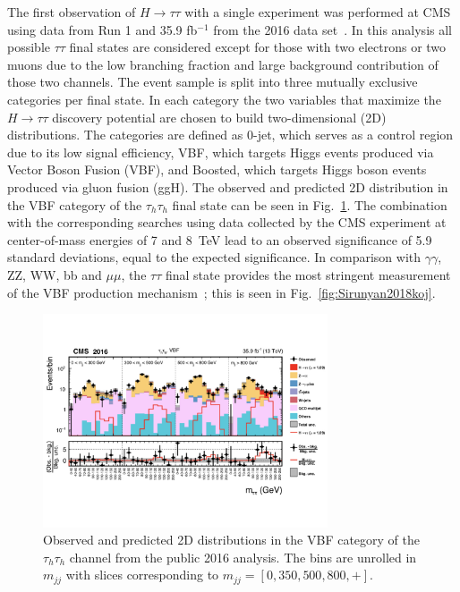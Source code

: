\documentclass[preprint,12pt]{elsarticle}
\begin{document}
The first observation of $H\rightarrow \tau \tau$ with a single experiment was performed 
at CMS using data from Run 1 and 35.9 fb$^{-1}$ from the 2016 data set~\cite{Aad:2015vsa}. 
In this analysis all possible $\tau\tau$ final states are considered except for those with
two electrons or two muons due to the low branching fraction and large background 
contribution of those two channels. The event sample is split into three mutually exclusive categories
per final state. In each category the two variables that maximize the $H\rightarrow \tau \tau$ 
discovery potential are chosen to build two-dimensional (2D) distributions. The 
categories are defined as 0-jet, which serves as a control region due to its low signal
efficiency, VBF, which targets Higgs events produced via Vector Boson Fusion (VBF), and
Boosted, which targets Higgs boson events produced via gluon fusion (ggH). The observed and predicted 2D distribution
in the VBF category of the $\tau_{h}\tau_{h}$ final state can be seen in Fig.~\ref{fig:vbf_2016}.
The combination with the corresponding searches using data collected by the CMS experiment 
at center-of-mass energies of 7 and 8~TeV lead to an observed significance of 5.9 standard 
deviations, equal to the expected significance. In comparison with $\gamma\gamma$, ZZ, WW, 
bb and $\mu\mu$, the $\tau\tau$ final state provides the most stringent measurement of the 
VBF production mechanism~\cite{Sirunyan:2018koj}; this is seen in Fig.~\ref{fig:Sirunyan2018koj}.
\begin{figure}[htbp]
\centering
     \includegraphics[trim=0 120 0 120,clip,width=0.75\textwidth]{HTT_Plots_2016.jpeg}
     \caption{Observed and predicted 2D distributions in the VBF category of the $\tau_{h}\tau_{h}$ channel from the public 2016 analysis. The bins are unrolled in $m_{jj}$ with slices corresponding to $m_{jj} = [0,350,500,800,+]$.}
     \label{fig:vbf_2016}
\end{figure}
\end{document}
